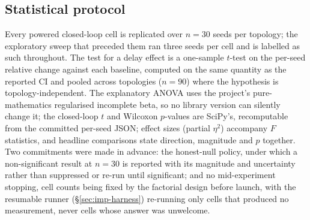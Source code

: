 \subsection{Statistical protocol}\label{sec:met-stats}
Every powered closed-loop cell is replicated over $n{=}30$ seeds per
topology; the exploratory sweep that preceded them ran three seeds per cell
and is labelled as such throughout. The test for a delay effect is a
one-sample $t$-test on the per-seed relative change against each baseline,
computed on the same quantity as the reported CI and pooled across
topologies ($n{=}90$) where the hypothesis is topology-independent. The
explanatory ANOVA uses the project's pure-mathematics regularised
incomplete beta, so no library version can silently change it; the
closed-loop $t$ and Wilcoxon $p$-values are SciPy's, recomputable from the
committed per-seed JSON; effect sizes (partial $\eta^2$) accompany $F$
statistics, and headline comparisons state direction, magnitude and $p$
together. Two commitments were made in advance: the honest-null policy,
under which a non-significant result at $n{=}30$ is reported with its
magnitude and uncertainty rather than suppressed or re-run until
significant; and no mid-experiment stopping, cell counts being fixed by
the factorial design before launch, with the resumable runner
(\S\ref{sec:imp-harness}) re-running only cells that produced no
measurement, never cells whose answer was unwelcome.
